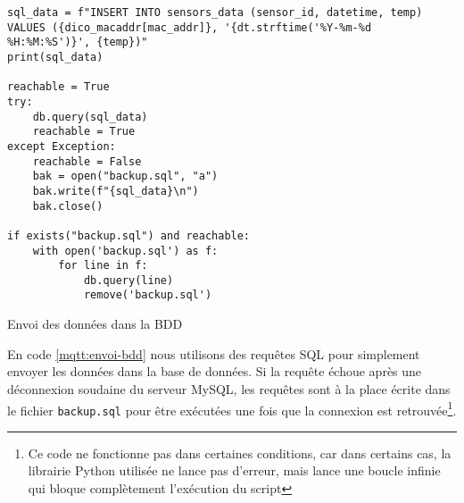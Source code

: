 \documentclass{article}
\begin{document}
    \begin{listing}[H]
        \begin{verbatim}
sql_data = f"INSERT INTO sensors_data (sensor_id, datetime, temp) VALUES ({dico_macaddr[mac_addr]}, '{dt.strftime('%Y-%m-%d %H:%M:%S')}', {temp})"
print(sql_data)

reachable = True
try:
    db.query(sql_data)
    reachable = True
except Exception:
    reachable = False
    bak = open("backup.sql", "a")
    bak.write(f"{sql_data}\n")
    bak.close()

if exists("backup.sql") and reachable:
    with open('backup.sql') as f:
        for line in f:
            db.query(line)
            remove('backup.sql')
        \end{verbatim}
        \caption{Envoi des données dans la BDD}
        \label{mqtt:envoi-bdd}
    \end{listing}
    En code \ref{mqtt:envoi-bdd} nous utilisons des requêtes SQL pour simplement envoyer les données dans la base de données. 
    Si la requête échoue après une déconnexion soudaine du serveur MySQL, les requêtes sont à la place écrite dans le fichier \verb|backup.sql| pour être exécutées une fois que la connexion est retrouvée\footnote{Ce code ne fonctionne pas dans certaines conditions, car dans certains cas, la librairie Python utilisée ne lance pas d'erreur, mais lance une boucle infinie qui bloque complètement l'exécution du script}.
\end{document}

